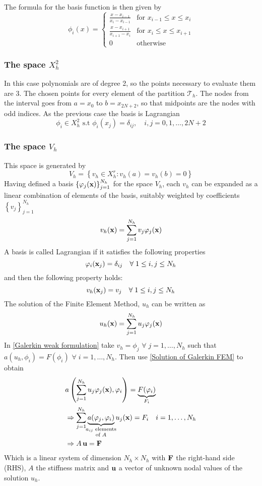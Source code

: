 The formula for the basis function is then given by 
\begin{equation}
    \phi_i(x) = \begin{cases}
        \frac{x-x_{i-1}}{x_i - x_{i-1}} & \text{for }x_{i-1} \leq x \leq x_i \\
        \frac{x-x_{i+1}}{x_{i+1} - x_i} & \text{for }x_i \leq x \leq x_{i+1} \\
        0 & \text{otherwise}
    \end{cases}
\end{equation}
\subsubsection*{The space \(X^2_h\)}
In this case polynomials are of degree 2, so the points necessary to evaluate them are \(3\). The chosen points for every element of the partition \(\mathcal{T}_h\). The nodes from the interval goes from \(a = x_0\) to \(b = x_{2N + 2}\), so that midpoints are the nodes with odd indices. As the previous case the basis is Lagrangian
\[
    \phi_i \in X^2_h \text{ s.t } \phi_i(x_j) = \delta_{ij}, \quad i, j = 0, 1, \ldots, 2N+2
\]
\subsubsection*{The space \(V_h\)}
This space is generated by 
\[
    V_h = \left\{v_h \in X^r_h : v_h(a) = v_h(b) = 0 \right\}
\]
Having defined a basis \(\left\lbrace\varphi_j(\textbf{x})\right\rbrace_{j=1}^{N_h}\) for the space \(V_h\), each \(v_h\) can be expanded as a linear combination of elements of the basis, suitably weighted by coefficients \(\left\{v_j\right\}_{j=1}^{N_h}\)
\[
    v_h(\textbf{x}) = \sum_{j=1}^{N_h} v_j \varphi_j(\textbf{x})
\]
A basis is called Lagrangian if it satisfies the following properties
\[
    \varphi_i(\textbf{x}_j) = \delta_{ij} \quad \forall \; 1 \leq i,j \leq N_h
\]
and then the following property holds:
\[
    v_h(\textbf{x}_j) = v_j \quad \forall \; 1 \leq i,j \leq N_h
\]
The solution of the Finite Element Method, \(u_h\) can be written as 
\begin{equation}
    u_h(\textbf{x}) = \sum_{j=1}^{N_h} u_j\varphi_j (\textbf{x}) \label{Solution of Galerkin FEM}
\end{equation}
In \eqref{Galerkin weak formulation} take \(v_h = \phi_j\) \(\forall \; j = 1,\ldots, N_h \) such that \(a(u_h,\phi_i) = F(\phi_i)\) \(\forall \; i = 1,\ldots,N_h\). Then use \eqref{Solution of Galerkin FEM} to obtain 
\begin{align*}
    &a\left( \sum_{j=1}^{N_h} u_j\phi_j (\vect{x}), \phi_i \right) = \underbrace{F(\phi_i)}_{F_i} \\ 
    &\Rightarrow \sum_{j=1}^{N_h} \underbrace{a(\phi_j, \phi_i)}_{\mathclap{\substack{a_{ij} \text{ elements}\\ \text{of } A}}} u_j (\vect{x}) = F_i \quad i = 1, \ldots, N_h \\
    &\Rightarrow A\,\vect{u} = \vect{F}
\end{align*}
Which is a linear system of dimension \(N_h \times N_h\) with \(\textbf{F}\) the right-hand side (RHS), \(A\) the stiffness matrix and \(\textbf{u}\) a vector of unknown nodal values of the solution \(u_h\).
